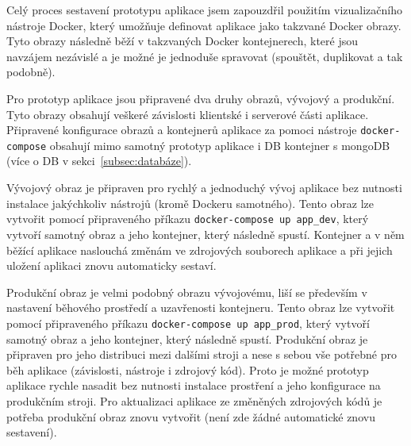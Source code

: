 Celý proces sestavení prototypu aplikace jsem zapouzdřil použitím vizualizačního nástroje Docker, který umožňuje definovat aplikace jako takzvané Docker obrazy.
Tyto obrazy následně běží v takzvaných Docker kontejnerech, které jsou navzájem nezávislé a je možné je jednoduše spravovat (spouštět, duplikovat a tak podobně).

Pro prototyp aplikace jsou připravené dva druhy obrazů, vývojový a produkční.
Tyto obrazy obsahují veškeré závislosti klientské i serverové části aplikace.
Připravené konfigurace obrazů a kontejnerů aplikace za pomoci nástroje \texttt{docker-compose} obsahují mimo samotný prototyp aplikace i DB kontejner s mongoDB (více o DB v sekci~\ref{subsec:databáze}).

Vývojový obraz je připraven pro rychlý a jednoduchý vývoj aplikace bez nutnosti instalace jakýchkoliv nástrojů (kromě Dockeru samotného).
Tento obraz lze vytvořit pomocí připraveného příkazu \texttt{docker-compose up app_dev}, který vytvoří samotný obraz a jeho kontejner, který následně spustí.
Kontejner a v něm běžící aplikace naslouchá změnám ve zdrojových souborech aplikace a při jejich uložení aplikaci znovu automaticky sestaví.

Produkční obraz je velmi podobný obrazu vývojovému, liší se především v nastavení běhového prostředí a uzavřenosti kontejneru.
Tento obraz lze vytvořit pomocí připraveného příkazu \texttt{docker-compose up app_prod}, který vytvoří samotný obraz a jeho kontejner, který následně spustí.
Produkční obraz je připraven pro jeho distribuci mezi dalšími stroji a nese s sebou vše potřebné pro běh aplikace (závislosti, nástroje i zdrojový kód).
Proto je možné prototyp aplikace rychle nasadit bez nutnosti instalace prostření a jeho konfigurace na produkčním stroji.
Pro aktualizaci aplikace ze změněných zdrojových kódů je potřeba produkční obraz znovu vytvořit (není zde žádné automatické znovu sestavení).
